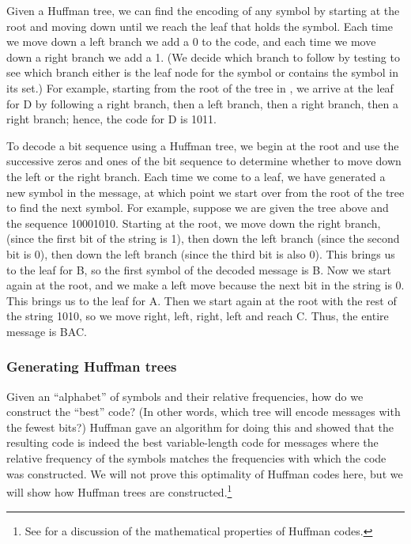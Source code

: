 Given a Huffman tree, we can find the encoding of any symbol by starting at the
root and moving down until we reach the leaf that holds the symbol.  Each time
we move down a left branch we add a 0 to the code, and each time we move down a
right branch we add a 1.  (We decide which branch to follow by testing to see
which branch either is the leaf node for the symbol or contains the symbol in
its set.)  For example, starting from the root of the tree in ,
we arrive at the leaf for D by following a right branch, then a left
branch, then a right branch, then a right branch; hence, the code for D is
1011.

To decode a bit sequence using a Huffman tree, we begin at the root and use the
successive zeros and ones of the bit sequence to determine whether to move down
the left or the right branch.  Each time we come to a leaf, we have generated a
new symbol in the message, at which point we start over from the root of the
tree to find the next symbol.  For example, suppose we are given the tree above
and the sequence 10001010.  Starting at the root, we move down the right
branch, (since the first bit of the string is 1), then down the left branch
(since the second bit is 0), then down the left branch (since the third bit is
also 0).  This brings us to the leaf for B, so the first symbol of the decoded
message is B.  Now we start again at the root, and we make a left move because
the next bit in the string is 0.  This brings us to the leaf for A.  Then we
start again at the root with the rest of the string 1010, so we move right,
left, right, left and reach C.  Thus, the entire message is BAC.

\subsubsection*{Generating Huffman trees}

Given an ``alphabet'' of symbols and their relative frequencies, how do we
construct the ``best'' code?  (In other words, which tree will encode messages
with the fewest bits?)  Huffman gave an algorithm for doing this and showed
that the resulting code is indeed the best variable-length code for messages
where the relative frequency of the symbols matches the frequencies with which
the code was constructed.  We will not prove this optimality of Huffman codes
here, but we will show how Huffman trees are constructed.\footnote{See 
for a discussion of the mathematical properties of Huffman codes.}

